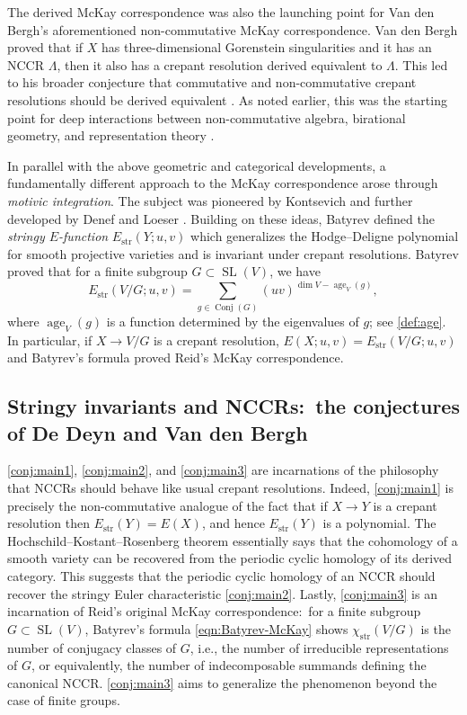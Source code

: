 \documentclass[12pt,a4paper]{amsart}
\theoremstyle{definition}
\newcommand{\str}{\mathrm{str}}
\renewcommand{\1}{\textbf{1}}
\newcommand{\<}{\langle}
\renewcommand{\>}{\rangle}
\DeclareMathOperator{\age}{age}
\DeclareMathOperator{\SL}{SL}
\DeclareMathOperator{\Conj}{Conj}
\begin{document}
The derived McKay correspondence was also the launching point for Van den Bergh's aforementioned non-commutative McKay correspondence. Van den Bergh \cite{vdB2004} proved that if 
$X$ has three-dimensional Gorenstein singularities and it has an NCCR $\Lambda$, then it also has a crepant resolution derived equivalent to $\Lambda$. This led to his broader conjecture that commutative and non-commutative crepant resolutions should be derived equivalent \cite{vdB2004}. As noted earlier, this was the starting point for deep interactions between non-commutative algebra, birational geometry, and representation theory \cite{vdB10,IW13,SpenkoVanDenBergh17,vanDenBerghICM}.

In parallel with the above geometric and categorical developments, a fundamentally different approach to the McKay correspondence arose through \emph{motivic integration}. The subject was pioneered by Kontsevich \cite{Kontsevich} and further developed by Denef and Loeser \cite{DenefLoeser1999,DenefLoeser2002}. Building on these ideas, Batyrev \cite{Batyrev1998} defined the \emph{stringy $E$-function} $E_{\str}(Y;u,v)$ which generalizes the Hodge--Deligne polynomial for smooth projective varieties and is invariant under crepant resolutions. Batyrev proved \cite{Batyrev99} that for a finite subgroup $G\subset\SL(V)$, we have
\begin{equation}\label{eqn:Batyrev-McKay}
	E_{\str}(V/G;u,v)=\sum_{g\in\Conj(G)}(uv)^{\dim V-\age_V(g)},
\end{equation}
where $\age_V(g)$ is a function determined by the eigenvalues of $g$; see \autoref{def:age}. In particular, if $X\to V/G$ is a crepant resolution, $E(X;u,v)=E_{\str}(V/G;u,v)$ and Batyrev's formula proved Reid's McKay correspondence.


\subsection{Stringy invariants and NCCRs:~the conjectures of De Deyn and Van den Bergh}
\autoref{conj:main1}, \autoref{conj:main2}, and \autoref{conj:main3} are incarnations of the philosophy that NCCRs should behave like usual crepant resolutions. Indeed, \autoref{conj:main1} is precisely the non-commutative analogue of the fact that if $X\to Y$ is a crepant resolution then $E_{\str}(Y)=E(X)$, and hence $E_{\str}(Y)$ is a polynomial. The Hochschild--Kostant--Rosenberg theorem \cite{HKR} essentially says that the cohomology of a smooth variety can be recovered from the periodic cyclic homology of its derived category. This suggests that the periodic cyclic homology of an NCCR should recover the stringy Euler characteristic \autoref{conj:main2}. Lastly, \autoref{conj:main3} is an incarnation of Reid's original McKay correspondence:~for a finite subgroup $G\subset\SL(V)$, Batyrev's formula \eqref{eqn:Batyrev-McKay} shows $\chi_{\str}(V/G)$ is the number of conjugacy classes of $G$, i.e., the number of irreducible representations of $G$, or equivalently, the number of indecomposable summands defining the canonical NCCR. \autoref{conj:main3} aims to generalize the phenomenon beyond the case of finite groups.
\end{document}
